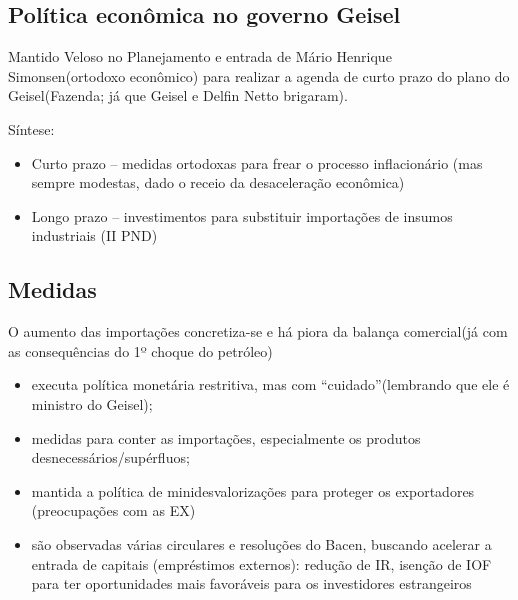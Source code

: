 \documentclass[a4paper,12pt]{article}[abntex2]
\begin{document}
\subsection{\textbf{Política econômica no governo Geisel}}
Mantido Veloso no Planejamento e entrada de Mário Henrique Simonsen(ortodoxo econômico) para realizar a agenda de curto prazo do plano do Geisel(Fazenda; já que Geisel e Delfin Netto brigaram). 

Síntese:\begin{itemize}
    \item Curto prazo – medidas ortodoxas para frear o processo inflacionário (mas sempre modestas, dado o receio da desaceleração econômica)
    \item Longo prazo – investimentos para substituir importações de insumos industriais (II PND)
\end{itemize}

\subsection{\textbf{Medidas}}
O aumento das importações concretiza-se e há piora da balança comercial(já com as consequências do 1º choque do petróleo)\begin{itemize}
    \item executa política monetária restritiva, mas com “cuidado”(lembrando que ele é ministro do Geisel);
    \item medidas para conter as importações, especialmente os produtos desnecessários/supérfluos; 
    \item mantida a política de minidesvalorizações para proteger os exportadores (preocupações com as EX)
    \item são observadas várias circulares e resoluções do Bacen, buscando acelerar a entrada de capitais (empréstimos externos): redução de IR, isenção de IOF para ter oportunidades mais favoráveis para os investidores estrangeiros
\end{itemize}
\end{document}
